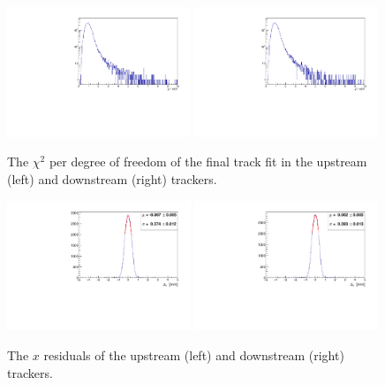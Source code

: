   \begin{figure}[p]
   \centering
    \includegraphics[width=0.49\textwidth, angle=0]{08-Performance/chi_squared_ndf_up.pdf}
    \includegraphics[width=0.49\textwidth, angle=0]{08-Performance/chi_squared_ndf_down.pdf}
   \caption{\label{fig:track_chisq} The $\chi^2$ per degree of freedom of the final track fit in the upstream (left) and downstream (right) trackers.}
  \end{figure}
  
  \begin{figure}[p]
    \begin{center}
      \includegraphics[width=0.49\textwidth, angle=0]{08-Performance/upstream_x_residual.pdf}
      \includegraphics[width=0.49\textwidth, angle=0]{08-Performance/downstream_x_residual.pdf}
      \caption{\label{fig:XResidKalman} The $x$ residuals of the upstream (left) and downstream (right) trackers.}
    \end{center}
  \end{figure}
  
